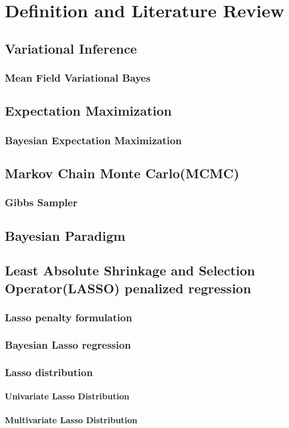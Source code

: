\chapter{Definition and Literature Review}
\label{Chapter2}
\section{Variational Inference}
\subsection{Mean Field Variational Bayes}

\section{Expectation Maximization}
\subsection{Bayesian Expectation Maximization}

\section{Markov Chain Monte Carlo(MCMC)}
\subsection{Gibbs Sampler}

\section{Bayesian Paradigm}


\section{Least Absolute Shrinkage and Selection Operator(LASSO) penalized regression}
\subsection{Lasso penalty formulation}
\subsection{Bayesian Lasso regression}
\subsection{Lasso distribution}
\subsubsection{Univariate Lasso Distribution}
\subsubsection{Multivariate Lasso Distribution}


